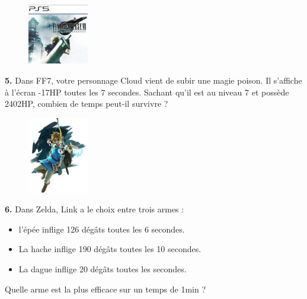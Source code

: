 \Pointilles[7]

\begin{minipage}[t]{0.25\textwidth}
  \begin{figure}[H]
    \centering
    \includegraphics[width=100px]{4x1-nombres-relatifs/ex2.jpg}
  \end{figure}
\end{minipage}
\begin{minipage}[t]{0.75\textwidth}
  \textbf{5.} Dans FF7, votre personnage Cloud vient de subir une magie poison. Il s'affiche à l'écran -17HP toutes les 7 secondes. Sachant qu'il est au niveau 7 et possède 2402HP, combien de temps peut-il survivre ?\\
  \Pointilles[6]
\end{minipage}

\Pointilles[3]

\begin{minipage}[t]{0.25\textwidth}
  \begin{figure}[H]
    \centering
    \includegraphics[width=100px]{4x1-nombres-relatifs/ex3.jpg}
  \end{figure}
\end{minipage}
\begin{minipage}[t]{0.75\textwidth}
  \textbf{6.} Dans Zelda, Link a le choix entre trois armes : 
  \begin{itemize}
    \item l'épée inflige 126 dégâts toutes les 6 secondes.
    \item La hache inflige 190 dégâts toutes les 10 secondes.
    \item La dague inflige 20 dégâts toutes les secondes.
  \end{itemize}
  Quelle arme est la plus efficace sur un temps de 1min ?\\
  \Pointilles[5]
\end{minipage}

